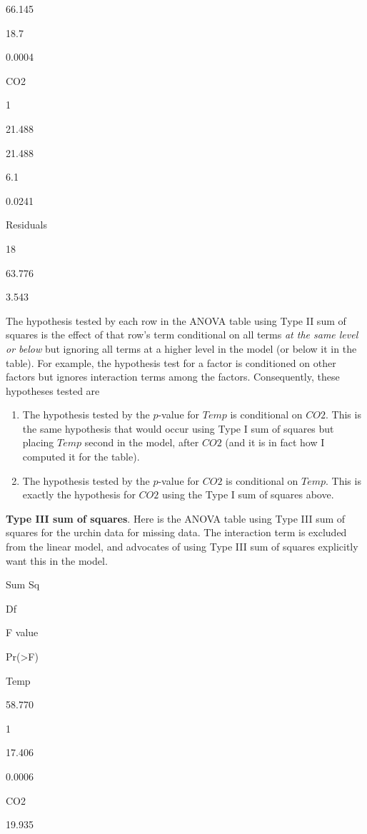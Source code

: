 \documentclass[]{book}
\begin{document}
66.145

18.7

0.0004

CO2

1

21.488

21.488

6.1

0.0241

Residuals

18

63.776

3.543

The hypothesis tested by each row in the ANOVA table using Type II sum
of squares is the effect of that row's term conditional on all terms
\emph{at the same level or below} but ignoring all terms at a higher
level in the model (or below it in the table). For example, the
hypothesis test for a factor is conditioned on other factors but ignores
interaction terms among the factors. Consequently, these hypotheses
tested are

\begin{enumerate}
\def\labelenumi{\arabic{enumi}.}
\item
  The hypothesis tested by the \(p\)-value for \(Temp\) is conditional
  on \(CO2\). This is the same hypothesis that would occur using Type I
  sum of squares but placing \(Temp\) second in the model, after \(CO2\)
  (and it is in fact how I computed it for the table).
\item
  The hypothesis tested by the \(p\)-value for \(CO2\) is conditional on
  \(Temp\). This is exactly the hypothesis for \(CO2\) using the Type I
  sum of squares above.
\end{enumerate}

\textbf{Type III sum of squares}. Here is the ANOVA table using Type III
sum of squares for the urchin data for missing data. The interaction
term is excluded from the linear model, and advocates of using Type III
sum of squares explicitly want this in the model.

Sum Sq

Df

F value

Pr(\textgreater{}F)

Temp

58.770

1

17.406

0.0006

CO2

19.935
\end{document}
